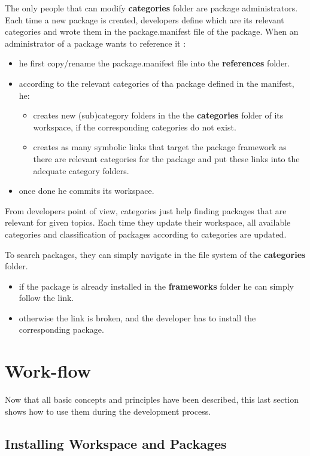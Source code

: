 \documentclass[12pt,a4paper]{article}
\begin{document}
The only people that can modify \textbf{categories} folder are package administrators. Each time a new package is created, developers define which are its relevant categories and wrote them in the package.manifest file of the package. When an administrator of a package wants to reference it :
\begin{itemize}
\item he first copy/rename the package.manifest file into the \textbf{references} folder.
\item according to the relevant categories of tha package defined in the manifest, he:
\begin{itemize}
\item creates new (sub)category folders in the the \textbf{categories} folder of its workspace, if the corresponding categories do not exist.
\item creates as many symbolic links that target the package framework as there are relevant categories for the package and put these links into the adequate category folders.
\end{itemize}
\item once done he commits its workspace.
\end{itemize}

From developers point of view, categories just help finding packages that are relevant for given topics. Each time they update their workspace, all available categories and classification of packages according to categories are updated. 

To search packages, they can simply navigate in the file system of the \textbf{categories} folder. 
\begin{itemize}
\item if the package is already installed in the \textbf{frameworks} folder he can simply follow the link.
\item otherwise the link is broken, and the developer has to install the corresponding package.
\end{itemize}


\section{Work-flow}

Now that all basic concepts and principles have been described, this last section shows how to use them during the development process.

\subsection{Installing Workspace and Packages}
\end{document}
